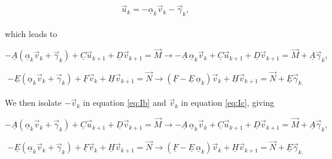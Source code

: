 \documentclass[11pt]{amsart}
\begin{document}
\begin{equation} \label{eq:Ia}
\vec{u}_{k}  = - \underline{\alpha}_{k}  \vec{v}_{k}  - \vec{\gamma}_{k},
\end{equation}
\\
which leads to

\begin{equation} \label{eq:Ib}
- \underline{A} \left(  \underline{\alpha}_{k}  \vec{v}_{k}  + \vec{\gamma}_{k} \right) + \underline{C} \vec{u}_{k+1} + \underline{D} \vec{v}_{k+1} = \vec{M}      \longrightarrow       - \underline{A} \, \underline{\alpha}_{k}  \vec{v}_{k}  + \underline{C} \vec{u}_{k+1} + \underline{D} \vec{v}_{k+1} = \vec{M}  + \underline{A} \vec{\gamma}_{k},
\end{equation} 

\begin{equation} \label{eq:Ic}
- \underline{E} \left(  \underline{\alpha}_{k}  \vec{v}_{k}  + \vec{\gamma}_{k} \right) + \underline{F} \vec{v}_{k} + \underline{H} \vec{v}_{k+1} = \vec{N}   \longrightarrow   \left( \underline{F} - \underline{E} \, \underline{\alpha}_{k} \right) \vec{v}_{k} + \underline{H} \vec{v}_{k+1} = \vec{N} + \underline{E} \vec{\gamma}_{k.}
\end{equation} 
\\
We then isolate $-\vec{v}_{k}$ in equation \ref{eq:Ib} and $\vec{v}_{k}$ in equation \ref{eq:Ic}, giving

\begin{equation} \label{eq:Id}
- \underline{A} \left(  \underline{\alpha}_{k}  \vec{v}_{k}  + \vec{\gamma}_{k} \right) + \underline{C} \vec{u}_{k+1} + \underline{D} \vec{v}_{k+1} = \vec{M}      \longrightarrow       - \underline{A} \, \underline{\alpha}_{k}  \vec{v}_{k}  + \underline{C} \vec{u}_{k+1} + \underline{D} \vec{v}_{k+1} = \vec{M}  + \underline{A} \vec{\gamma}_{k},
\end{equation} 

\begin{equation} \label{eq:Ie}
- \underline{E} \left(  \underline{\alpha}_{k}  \vec{v}_{k}  + \vec{\gamma}_{k} \right) + \underline{F} \vec{v}_{k} + \underline{H} \vec{v}_{k+1} = \vec{N}   \longrightarrow   \left( \underline{F} - \underline{E} \, \underline{\alpha}_{k} \right) \vec{v}_{k} + \underline{H} \vec{v}_{k+1} = \vec{N} + \underline{E} \vec{\gamma}_{k.}
\end{equation} 
\\
\end{document}
